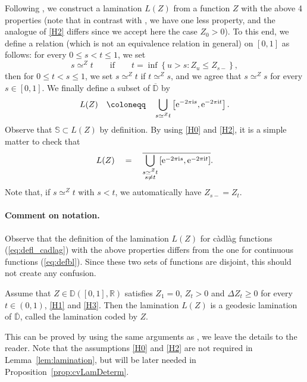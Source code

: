 \documentclass[10pt]{amsart}
\theoremstyle{definition}\newtheorem{defi}[theo]{Definition}\newtheorem{rema}[theo]{Remark}\newtheorem{exam}[theo]{Example}\newtheorem{exem}[theo]{Example}\newtheorem{nota}[theo]{Notation}
\newcommand{\R}{\mathbb{R}}
\newcommand{\D}{\mathbb{D}}
\def\S{\mathbb{S}}
\def\e{{\rm e}}
\def\i{\mathrm{i}}
\begin{document}
Following \cite{Kor14},
we construct a lamination $L(Z)$ from a function $Z$ with the above 4 properties
(note that in contrast with \cite{Kor14}, we have one less property,
and the analogue of \ref{H2} differs since we accept here the case $Z_{0} > 0$).
To this end, we define a relation (which is not an equivalence relation in general) on $[0, 1]$ as follows:
for every $0 \le s < t \le 1$, we set
\[
s \simeq^Z t \qquad\text{if}\qquad t = \inf \left\{u > s : Z_{u} \le Z_{s-} \right\},
\]
then for $0 \le t < s \le 1$, we set $s \simeq^Z t$ if $t \simeq^Z s$, and we agree that $s \simeq^Z s$ for every $s \in [0,1]$. We finally define a subset of $\overline{\D}$ by
\begin{equation}
L(Z) \quad \coloneqq \quad \bigcup_{s \simeq^Z t} \left[\e^{-2\pi \i s}, \e^{-2\pi\i t}\right].
\label{eq:defl_cadlag}
\end{equation}
Observe that $\S \subset L(Z)$ by definition. By using \ref{H0} and \ref{H2}, it is a simple matter to check that
\begin{equation}\label{eq:lamination_stable2}
L(Z) \quad = \quad \overline{\bigcup_{\substack{s \simeq^Z t \\ s \neq t}} \left[\e^{-2\pi \i s}, \e^{-2\pi\i t}\right]}.
\end{equation}
Note that, if $s \simeq^Z t$ with $s<t$, we automatically have $Z_{s-}=Z_{t}$.

\paragraph*{Comment on notation.} Observe that the definition of the lamination $L(Z)$ for c\`adl\`ag functions  (\cref{eq:defl_cadlag}) with the above properties differs from the one
for continuous functions (\cref{eq:defbl}). Since these two sets of functions are disjoint, this should not create any confusion.


\begin{lemma}
\label{lem:lamination}Assume that  $Z \in {\D}([0, 1], \R)$ satisfies $Z_{1} = 0$, $Z_{t} > 0$ and $\Delta Z_{t} \ge 0$ for every $t \in (0,1)$, \ref{H1} and \ref{H3}. Then the lamination $L(Z)$ is a geodesic lamination of $\overline{\D}$, called the lamination coded by $Z$.
\end{lemma}
This can be proved by using the same arguments as \cite[Prop. 2.9]{Kor14}, we leave the details to the reader.
Note that the assumptions \ref{H0} and \ref{H2} are not required in Lemma~\ref{lem:lamination},
but will be later needed in Proposition~\ref{prop:cvLamDeterm}.
\end{document}

